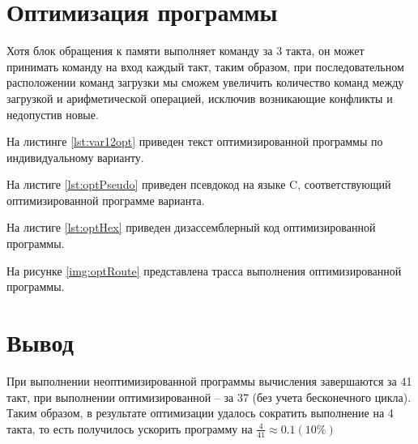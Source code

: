 \section{Оптимизация программы}

Хотя блок обращения к памяти выполняет команду за 3 такта, он может принимать
команду на вход каждый такт, таким образом, при последовательном расположении
команд загрузки мы сможем увеличить количество команд между загрузкой и
арифметической операцией, исключив возникающие конфликты и недопустив новые.

На листинге \ref{lst:var12opt} приведен текст оптимизированной программы по
индивидуальному варианту.


На листиге \ref{lst:optPseudo} приведен псевдокод на языке C, соответствующий
оптимизированной программе варианта.


На листиге \ref{lst:optHex} приведен дизассемблерный код оптимизированной
программы.


На рисунке \ref{img:optRoute} представлена трасса выполнения оптимизированной
программы.

\section{Вывод}

При выполнении неоптимизированной программы вычисления завершаются за 41
такт, при выполнении оптимизированной -- за 37 (без учета бесконечного цикла).
Таким образом, в результате оптимизации удалось сократить выполнение на 4
такта, то есть получилось ускорить программу на
$\frac{4}{41} \approx 0.1 (10\%)$

~\\
~\\
~\\
~\\
~\\
~\\
~\\
~\\
~\\
~\\
~\\
~\\
~\\
~\\
~\\
~\\
~\\
~\\
~\\
~\\
~\\


